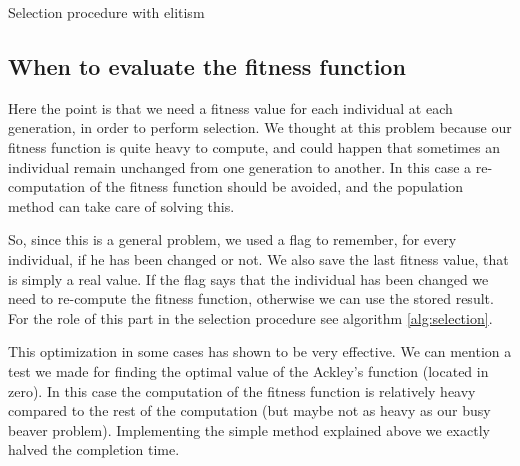 \documentclass{report}
\begin{document}
\begin{algorithm}[t]
\caption[Selection procedure]{Selection procedure with elitism}
\label{alg:selection}

\Begin{
	\For{$i\leftarrow 0$ \KwTo $N-1$}{
		\If{$p[i]$ is a new individual, or is changed}{
			$p[i].value \leftarrow$ \emph{updated fitness value of $p[i]$}\;
		}
	}
	\BlankLine
	\emph{sort $p$ based on the fitness values}\;
	\BlankLine
	\If{$ N < M $}{
		\Return{}\;
	}
	\BlankLine
	$threshold = \frac{N-M}{N-S}$\;
	\For{$i\leftarrow S$ \KwTo $N-1$}{
		\If{\random{} $< threshold$}{
			\emph{erase $i$};
		}
	}
}
\end{algorithm}

\subsection{When to evaluate the fitness function}

Here the point is that we need a fitness value for each individual at each generation, in order to perform selection.
We thought at this problem because our fitness function is quite heavy to compute, and could happen that sometimes an individual remain unchanged from one generation to another. In this case a re-computation of the fitness function should be avoided, and the population method can take care of solving this.

So, since this is a general problem, we used a flag to remember, for every individual, if he has been changed or not. We also save the last fitness value, that is simply a real value. If the flag says that the individual has been changed we need to re-compute the fitness function, otherwise we can use the stored result. For the role of this part in the selection procedure see algorithm \ref{alg:selection}.

This optimization in some cases has shown to be very effective. We can mention a test we made for finding the optimal value of the Ackley's function (located in zero). In this case the computation of the fitness function is relatively heavy compared to the rest of the computation (but maybe not as heavy as our busy beaver problem).
Implementing the simple method explained above we exactly halved the completion time.
\end{document}
